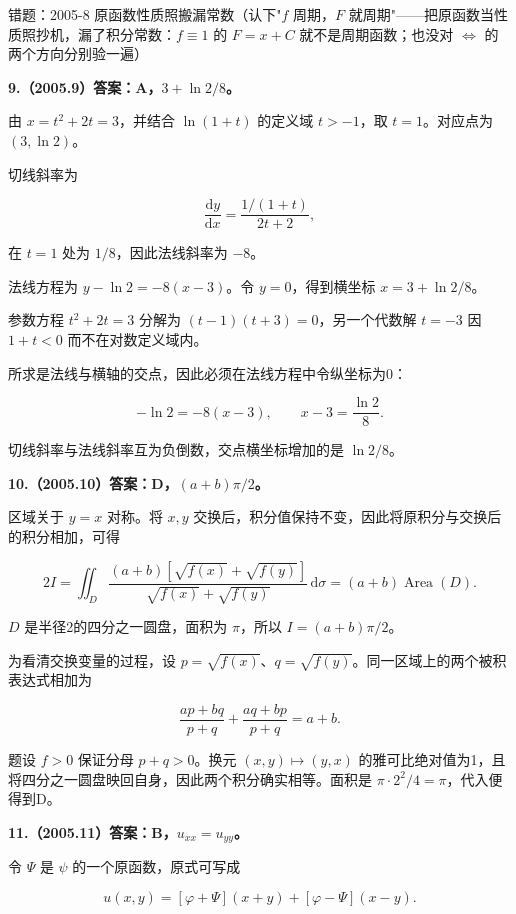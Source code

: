\documentclass[UTF8,11pt,fontset=windows]{ctexart}
\begin{document}
\begingroup\color{gray}错题：2005-8 原函数性质照搬漏常数（认下"$f$ 周期，$F$ 就周期"——把原函数当性质照抄机，漏了积分常数：$f\equiv1$ 的 $F=x+C$ 就不是周期函数；也没对 $\iff$ 的两个方向分别验一遍）\par\endgroup

\clearpage

\textbf{9.（2005.9）答案：A，$3+\ln2/8$。}

由 $x=t^2+2t=3$，并结合 $\ln(1+t)$ 的定义域 $t>-1$，取 $t=1$。对应点为 $(3,\ln2)$。

切线斜率为

$$
\frac{\mathrm dy}{\mathrm dx}=\frac{1/(1+t)}{2t+2},
$$

在 $t=1$ 处为 $1/8$，因此法线斜率为 $-8$。

法线方程为 $y-\ln2=-8(x-3)$。令 $y=0$，得到横坐标 $x=3+\ln2/8$。

参数方程 $t^2+2t=3$ 分解为 $(t-1)(t+3)=0$，另一个代数解 $t=-3$ 因 $1+t<0$ 而不在对数定义域内。

所求是法线与横轴的交点，因此必须在法线方程中令纵坐标为0：

$$
-\ln2=-8(x-3),\qquad x-3=\frac{\ln2}{8}.
$$

切线斜率与法线斜率互为负倒数，交点横坐标增加的是 $\ln2/8$。

\clearpage

\textbf{10.（2005.10）答案：D，$(a+b)\pi/2$。}

区域关于 $y=x$ 对称。将 $x,y$ 交换后，积分值保持不变，因此将原积分与交换后的积分相加，可得

$$
2I=\iint_D
\frac{(a+b)[\sqrt{f(x)}+\sqrt{f(y)}]}{\sqrt{f(x)}+\sqrt{f(y)}}\,\mathrm d\sigma
=(a+b)\operatorname{Area}(D).
$$

$D$ 是半径2的四分之一圆盘，面积为 $\pi$，所以 $I=(a+b)\pi/2$。

为看清交换变量的过程，设 $p=\sqrt{f(x)}$、$q=\sqrt{f(y)}$。同一区域上的两个被积表达式相加为

$$
\frac{ap+bq}{p+q}+\frac{aq+bp}{p+q}=a+b.
$$

题设 $f>0$ 保证分母 $p+q>0$。换元 $(x,y)\mapsto(y,x)$ 的雅可比绝对值为1，且将四分之一圆盘映回自身，因此两个积分确实相等。面积是 $\pi\cdot2^2/4=\pi$，代入便得到D。

\clearpage

\textbf{11.（2005.11）答案：B，$u_{xx}=u_{yy}$。}

令 $\Psi$ 是 $\psi$ 的一个原函数，原式可写成

$$
u(x,y)=[\varphi+\Psi](x+y)+[\varphi-\Psi](x-y).
$$
\end{document}
